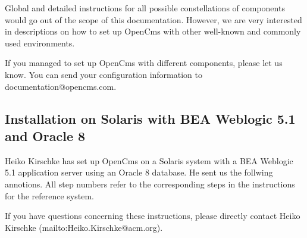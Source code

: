 Global and detailed instructions for all possible constellations of components
would go out of the scope of this documentation. However, we are very
interested in descriptions on how to set up OpenCms with other
well-known and commonly used environments. 

If you managed to set up OpenCms with different components, please let us know. 
You can send your configuration information to documentation@opencms.com.

\subsection{Installation on Solaris with BEA Weblogic 5.1 and Oracle 8}
Heiko Kirschke has set up OpenCms on 
a Solaris system with a BEA Weblogic 5.1 application server using an
Oracle 8 database. He sent us the follwing annotions. All step numbers
refer to the corresponding steps in the instructions for the reference system.

If you have questions
concerning these instructions, please directly contact Heiko Kirschke 
(mailto:Heiko.Kirschke@acm.org).


